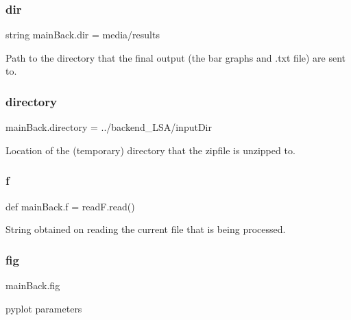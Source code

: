 \subsubsection{\texorpdfstring{dir}{dir}}
{\footnotesize\ttfamily string main\+Back.\+dir = \textquotesingle{}media/results\textquotesingle{}}



Path to the directory that the final output (the bar graphs and .txt file) are sent to. 

\mbox{\label{namespacemain_back_a1c89e94124b1c6fedb3a2c9fe2d299c4}} 
\subsubsection{\texorpdfstring{directory}{directory}}
{\footnotesize\ttfamily main\+Back.\+directory = \textquotesingle{}../backend\+\_\+\+L\+SA/input\+Dir\textquotesingle{}}



Location of the (temporary) directory that the zipfile is unzipped to. 

\mbox{\label{namespacemain_back_a70be22d9dd8cbf946f881a6372fba10a}} 
\subsubsection{\texorpdfstring{f}{f}}
{\footnotesize\ttfamily def main\+Back.\+f = read\+F.\+read()}



String obtained on reading the current file that is being processed. 

\mbox{\label{namespacemain_back_ae2547d943b7148a0226f3c43b2cbe697}} 
\subsubsection{\texorpdfstring{fig}{fig}}
{\footnotesize\ttfamily main\+Back.\+fig}



pyplot parameters 

\mbox{\label{namespacemain_back_a9176897b1308459712e81dc0f702d167}} 
